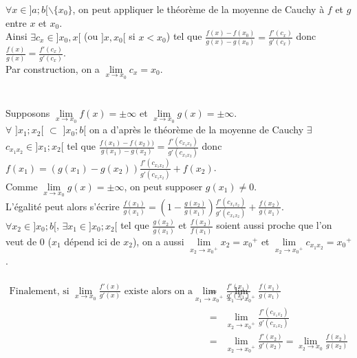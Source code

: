 \documentclass[a4paper,10pt]{book} %
\begin{document}
$\forall x\in ]a;b[\backslash\{x_0\}$, on peut appliquer le théorème de la moyenne de Cauchy à $f$ et $g$ entre $x$ et $x_0$.\\
Ainsi $\exists c_x \in ]x_0,x[$ (ou $]x, x_0[$ si $x<x_0$) tel que $\frac{f(x)-f(x_0)}{g(x)-g(x_0)}=\frac{f'(c_x)}{g'(c_x)}$ donc $\frac{f(x)}{g(x)}=\frac{f'(c_x)}{g'(c_x)}$.\\

Par construction, on a $\lim\limits_{x\rightarrow x_0} c_x=x_0$.\\\\\\

Supposons $\lim\limits_{x\rightarrow x_0} f(x)=\pm \infty$ et $\lim\limits_{x\rightarrow x_0} g(x)=\pm \infty$.\\

$\forall$ $]x_1;x_2[$ $\subset$ $]x_0;b[$ on a d'après le théorème de la moyenne de Cauchy $\exists$ $c_{x_1 x_2}\in ]x_1;x_2[$ tel que $\frac{f(x_1)-f(x_2))}{g(x_1)-g(x_2)}=\frac{f'(c_{x_1 x_2})}{g'(c_{x_1 x_2})}$ donc $f(x_1)=(g(x_1)-g(x_2))\frac{f'(c_{x_1 x_2})}{g'(c_{x_1 x_2})}+f(x_2)$.\\

Comme $\lim\limits_{x\rightarrow x_0}g(x)=\pm \infty$, on peut supposer $g(x_1)\neq 0$.\\
L'égalité peut alors s'écrire $\frac{f(x_1)}{g(x_1)}=(1-\frac{g(x_2)}{g(x_1)})\frac{f'(c_{x_1 x_2})}{g'(c_{x_1 x_2})}+\frac{f(x_2)}{g(x_1)}$.\\

$\forall x_2 \in ]x_0;b[$, $\exists x_1\in ]x_0;x_2[$ tel que $\frac{g(x_2)}{g(x_1)}$ et $\frac{f(x_2)}{f(x_1)}$ soient aussi proche que l'on veut de 0 ($x_1$ dépend ici de $x_2$), on a aussi $\lim\limits_{x_2 \rightarrow x_0{}^{+}} x_2=x_0{}^+$ et $\lim\limits_{x_2 \rightarrow x_0{}^+} c_{x_1 x_2}=x_0{}^+$.\\\\

$\begin{array}{rcl} \text{Finalement, si }\lim\limits_{x\rightarrow x_0} \frac{f'(x)}{g'(x)}\text{ existe alors on a} \lim\limits_{x_1\rightarrow x_0{} ^+}\frac{f'(x_1)}{g'(x_1)}&=&\lim\limits_{x_1 \rightarrow x_0{}^+} \frac{f(x_1)}{g(x_1)}\\
&=&\lim\limits_{x_2 \rightarrow x_0{}^+} \frac{f'(c_{x_1 x_2})}{g'(c_{x_1 x_2})}\\
&=&\lim\limits_{x_2 \rightarrow x_0{}^+} \frac{f'(x_2)}{g'(x_2)}=\lim\limits_{x_2 \rightarrow x_0}\frac{f(x_2)}{g(x_2)}\end{array}$\\
\end{document}
